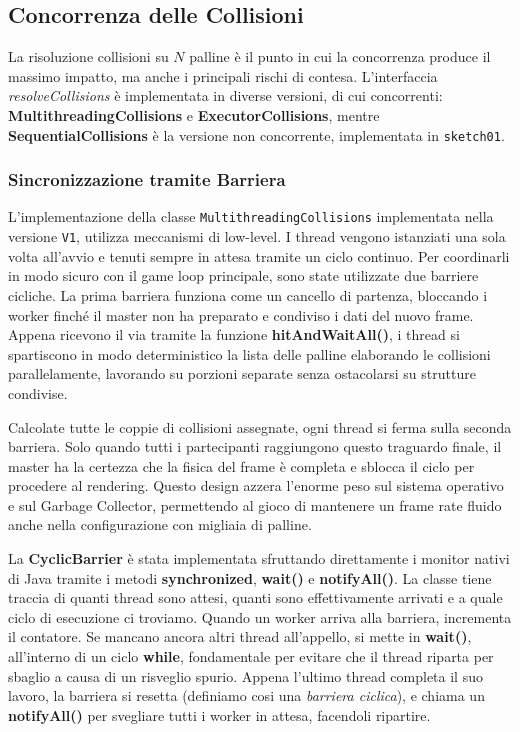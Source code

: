 \subsection{Concorrenza delle Collisioni}
La risoluzione collisioni su $N$ palline è il punto in cui la concorrenza produce il massimo impatto, ma anche i principali rischi di contesa.
L'interfaccia \emph{resolveCollisions} è implementata in diverse versioni, di cui concorrenti: \textbf{MultithreadingCollisions} e \textbf{ExecutorCollisions}, mentre \textbf{SequentialCollisions} è la versione non concorrente, implementata in \texttt{sketch01}.

\subsubsection{Sincronizzazione tramite Barriera }
L'implementazione della classe \texttt{MultithreadingCollisions} implementata nella versione \texttt{V1}, utilizza meccanismi di low-level. I thread vengono istanziati una sola volta all'avvio e tenuti sempre in attesa tramite un ciclo continuo. 
Per coordinarli in modo sicuro con il game loop principale, sono state utilizzate due barriere cicliche.
La prima barriera funziona come un cancello di partenza, bloccando i worker finché il master non ha preparato e condiviso i dati del nuovo frame. Appena ricevono il via tramite la funzione \textbf{hitAndWaitAll()}, i thread si spartiscono in modo deterministico la lista delle palline elaborando le collisioni parallelamente, lavorando su porzioni separate senza ostacolarsi su strutture condivise.

Calcolate tutte le coppie di collisioni assegnate, ogni thread si ferma sulla seconda barriera. Solo quando tutti i partecipanti raggiungono questo traguardo finale, il master ha la certezza che la fisica del frame è completa e sblocca il ciclo per procedere al rendering. Questo design azzera l'enorme peso sul sistema operativo e sul Garbage Collector, permettendo al gioco di mantenere un frame rate fluido anche nella configurazione con migliaia di palline.

La \textbf{CyclicBarrier} è stata implementata sfruttando direttamente i monitor nativi di Java tramite i metodi \textbf{synchronized}, \textbf{wait()} e \textbf{notifyAll()}. La classe tiene traccia di quanti thread sono attesi, quanti sono effettivamente arrivati e a quale ciclo di esecuzione ci troviamo. Quando un worker arriva alla barriera, incrementa il contatore. Se mancano ancora altri thread all'appello, si mette in \textbf{wait()}, all'interno di un ciclo \textbf{while}, fondamentale per evitare che il thread riparta per sbaglio a causa di un risveglio spurio. Appena l'ultimo thread completa il suo lavoro, la barriera si resetta (definiamo cosi una \emph{barriera ciclica}), e chiama un \textbf{notifyAll()} per svegliare tutti i worker in attesa, facendoli ripartire.

